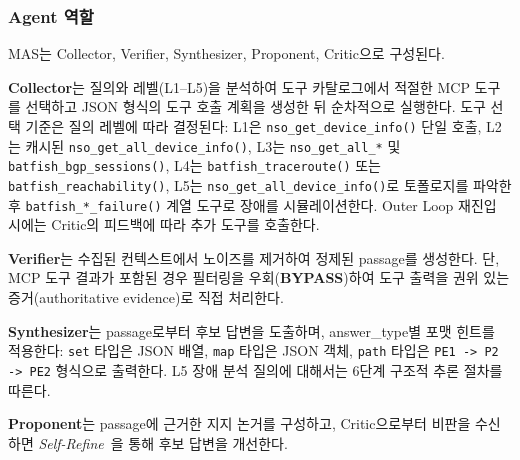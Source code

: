 \subsubsection{Agent 역할}

MAS는 Collector, Verifier, Synthesizer, Proponent, Critic으로 구성된다.

\textbf{Collector}는 질의와 레벨(L1--L5)을 분석하여
도구 카탈로그에서 적절한 MCP 도구를 선택하고
JSON 형식의 도구 호출 계획을 생성한 뒤 순차적으로 실행한다.
도구 선택 기준은 질의 레벨에 따라 결정된다:
L1은 \texttt{nso\_get\_device\_info()} 단일 호출, L2는 캐시된 \texttt{nso\_get\_all\_device\_info()}, L3는 \texttt{nso\_get\_all\_*} 및 \texttt{batfish\_bgp\_sessions()}, L4는 \texttt{batfish\_traceroute()} 또는 \texttt{batfish\_reachability()}, L5는 \texttt{nso\_get\_all\_device\_info()}로 토폴로지를 파악한 후 \texttt{batfish\_*\_failure()} 계열 도구로 장애를 시뮬레이션한다. Outer Loop 재진입 시에는 Critic의 피드백에 따라 추가 도구를 호출한다.


\textbf{Verifier}는 수집된 컨텍스트에서 노이즈를 제거하여
정제된 passage를 생성한다.
단, MCP 도구 결과가 포함된 경우 필터링을 우회(\textbf{BYPASS})하여
도구 출력을 권위 있는 증거(authoritative evidence)로 직접 처리한다.

\textbf{Synthesizer}는 passage로부터 후보 답변을 도출하며,
answer\_type별 포맷 힌트를 적용한다:
\texttt{set} 타입은 JSON 배열, \texttt{map} 타입은 JSON 객체,
\texttt{path} 타입은 \texttt{PE1 -> P2 -> PE2} 형식으로 출력한다.
L5 장애 분석 질의에 대해서는 6단계 구조적 추론 절차를 따른다.

\textbf{Proponent}는 passage에 근거한 지지 논거를 구성하고,
Critic으로부터 비판을 수신하면
\textit{Self-Refine}~\cite{madaan2023selfrefine}을 통해
후보 답변을 개선한다.

